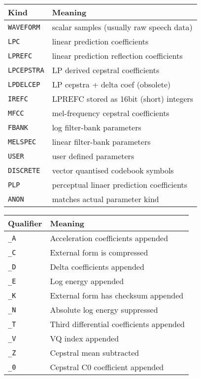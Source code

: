 \begin{center}
\begin{tabular}{|p{2.6cm}|p{8.7cm}|} \hline
Kind &  Meaning  \\ \hline
\texttt{WAVEFORM} & scalar samples (usually raw speech data)  \\
\texttt{LPC} & linear prediction coefficients  \\
\texttt{LPREFC} & linear prediction reflection coefficients  \\
\texttt{LPCEPSTRA}   & LP derived cepstral coefficients  \\
\texttt{LPDELCEP} & LP cepstra + delta coef (obsolete)  \\
\texttt{IREFC} & LPREFC stored as 16bit (short) integers  \\
\texttt{MFCC}  & mel-frequency cepstral coefficients  \\
\texttt{FBANK} & log filter-bank parameters  \\
\texttt{MELSPEC} & linear filter-bank parameters  \\
\texttt{USER} & user defined parameters  \\
\texttt{DISCRETE} &  vector quantised codebook symbols  \\
\texttt{PLP} &  perceptual linaer prediction coefficients  \\
\texttt{ANON} & matches actual parameter kind \\ \hline
\end{tabular}
\end{center}

\begin{center}
\begin{tabular}{|p{2.6cm}|p{8.7cm}|} \hline
Qualifier &  Meaning  \\ \hline
\texttt{\_A} &  Acceleration coefficients appended \\
\texttt{\_C} &  External form is compressed\\
\texttt{\_D} &  Delta coefficients appended \\
\texttt{\_E} &  Log energy appended\\
\texttt{\_K} &  External form has checksum appended\\
\texttt{\_N} &  Absolute log energy suppressed \\
\texttt{\_T} &  Third differential coefficients appended \\
\texttt{\_V} &  VQ index appended\\
\texttt{\_Z} &  Cepstral mean subtracted\\
\texttt{\_0} &  Cepstral C0 coefficient appended\\ \hline
\end{tabular}
\end{center}

